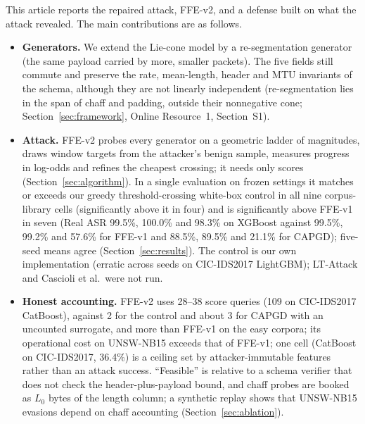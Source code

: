 This article reports the repaired attack, FFE-v2, and a defense built on what the attack revealed. The main contributions are as follows.
\begin{itemize}
    \item \textbf{Generators.} We extend the Lie-cone model by a re-segmentation generator (the same payload carried by more, smaller packets). The five fields still commute and preserve the rate, mean-length, header and MTU invariants of the schema, although they are not linearly independent (re-segmentation lies in the span of chaff and padding, outside their nonnegative cone; Section~\ref{sec:framework}, Online Resource~1, Section~S1).
    \item \textbf{Attack.} FFE-v2 probes every generator on a geometric ladder of magnitudes, draws window targets from the attacker's benign sample, measures progress in log-odds and refines the cheapest crossing; it needs only scores (Section~\ref{sec:algorithm}). In a single evaluation on frozen settings it matches or exceeds our greedy threshold-crossing white-box control in all nine corpus-library cells (significantly above it in four) and is significantly above FFE-v1 in seven (Real ASR 99.5\%, 100.0\% and 98.3\% on XGBoost against 99.5\%, 99.2\% and 57.6\% for FFE-v1 and 88.5\%, 89.5\% and 21.1\% for CAPGD); five-seed means agree (Section~\ref{sec:results}). The control is our own implementation (erratic across seeds on CIC-IDS2017 LightGBM); LT-Attack and Cascioli et al.\ were not run.
    \item \textbf{Honest accounting.} FFE-v2 uses 28--38 score queries (109 on CIC-IDS2017 CatBoost), against 2 for the control and about 3 for CAPGD with an uncounted surrogate, and more than FFE-v1 on the easy corpora; its operational cost on UNSW-NB15 exceeds that of FFE-v1; one cell (CatBoost on CIC-IDS2017, 36.4\%) is a ceiling set by attacker-immutable features rather than an attack success. ``Feasible'' is relative to a schema verifier that does not check the header-plus-payload bound, and chaff probes are booked as $L_0$ bytes of the length column; a synthetic replay shows that UNSW-NB15 evasions depend on chaff accounting (Section~\ref{sec:ablation}).

\end{itemize}
